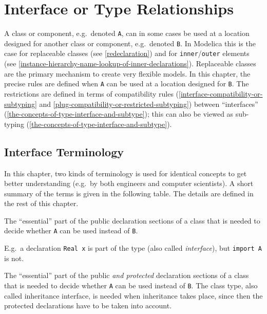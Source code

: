 \chapter{Interface or Type Relationships}\label{interface-or-type-relationships}

A class or component, e.g.\ denoted \lstinline!A!, can in some cases be used at a
location designed for another class or component, e.g.\ denoted \lstinline!B!. In
Modelica this is the case for replaceable classes (see \cref{redeclaration}) and
for \lstinline!inner!/\lstinline!outer! elements (see \cref{instance-hierarchy-name-lookup-of-inner-declarations}).
Replaceable classes are the
primary mechanism to create very flexible models. In this chapter, the
precise rules are defined when \lstinline!A! can be used at a location designed for
\lstinline!B!. The restrictions are defined in terms of compatibility rules
(\cref{interface-compatibility-or-subtyping} and \cref{plug-compatibility-or-restricted-subtyping}) between ``interfaces'' (\cref{the-concepts-of-type-interface-and-subtype}); this can
also be viewed as sub-typing (\cref{the-concepts-of-type-interface-and-subtype}).

\section{Interface Terminology}\label{interface-terminology}
In this chapter, two kinds of terminology is used for identical concepts
to get better understanding (e.g.\ by both engineers and computer
scientists). A short summary of the terms is given in the following
table. The details are defined in the rest of this chapter.

\begin{definition}
The ``essential'' part of the public declaration sections of a class
that is needed to decide whether \lstinline!A! can be used instead of \lstinline!B!.
\par
\begin{nonnormative*}
E.g.\ a declaration \lstinline!Real x! is part of the type (also called \emph{interface}), but \lstinline!import A! is not.
\end{nonnormative*}
\end{definition}

\begin{definition}
The ``essential'' part of the public \emph{and protected} declaration sections of a class that is needed to decide whether \lstinline!A! can be used instead of \lstinline!B!. The class type, also
called inheritance interface, is needed when inheritance takes place, since then the protected declarations have to be taken into account.
\end{definition}

